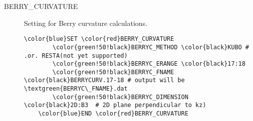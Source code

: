 \documentclass[a4paper,12pt]{scrartcl}
\makeatletter
\def\namedlabel#1#2{\begingroup
    #2%
    \def\@currentlabel{#2}%
    \phantomsection\label{#1}\endgroup
}
\newcommand{\textgreen}[1]{\textcolor{green!50!black}{\texttt{#1}}}
\makeatother
\begin{document}
\begin{description}
    \item[\namedlabel{tag:BERRYC}{BERRY\_CURVATURE}]
		Setting for Berry curvature calculations.
 \begin{Verbatim}[commandchars=\\\{\},gobble=4, frame=single, framesep=2mm, 
	label= Berrycurvature setup,
	labelposition=bottomline]
    \color{blue}SET \color{red}BERRY_CURVATURE
        \color{green!50!black}BERRYC_METHOD \color{black}KUBO # .or. RESTA(not yet supported)
        \color{green!50!black}BERRYC_ERANGE \color{black}17:18
        \color{green!50!black}BERRYC_FNAME  \color{black}BERRYCURV.17-18 # output will be \textgreen{BERRYC\_FNAME}.dat
        \color{green!50!black}BERRYC_DIMENSION \color{black}2D:B3  # 2D plane perpendicular to kz)
    \color{blue}END \color{red}BERRY_CURVATURE
 \end{Verbatim}


\end{description}
\end{document}
